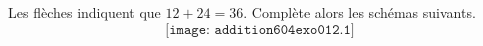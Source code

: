 Les flèches indiquent que $12+24=36$. Complète alors les schémas suivants.
\[\texttt{[image: addition604exo012.1]}\]